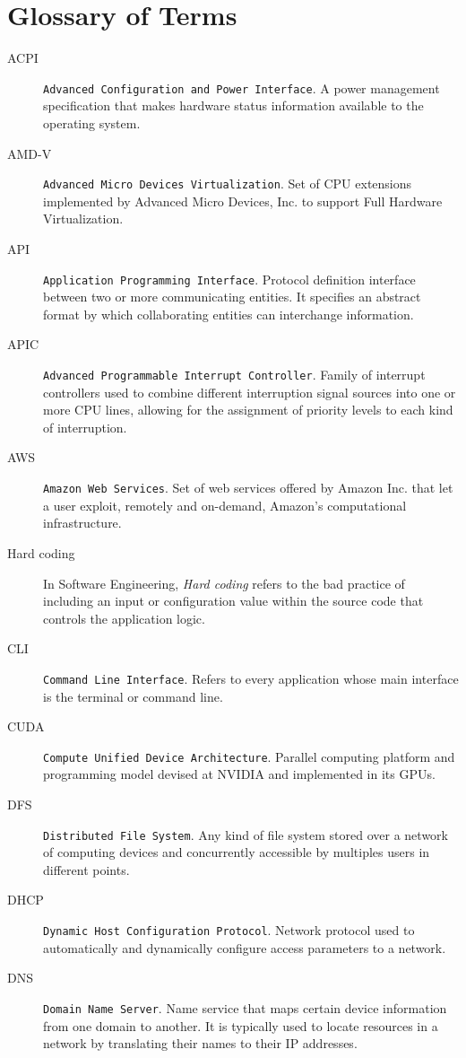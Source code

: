 \chapter{Glossary of Terms}\label{cap:glosario}
\begin{description}
\item[ACPI] \texttt{Advanced Configuration and Power Interface}. A power management specification that makes hardware status information available to the operating system.
\item[AMD-V] \texttt{Advanced Micro Devices Virtualization}. Set of CPU extensions implemented by Advanced Micro Devices, Inc. to support Full Hardware Virtualization.
\item[API] \texttt{Application Programming Interface}. Protocol definition interface between two or more communicating entities. It specifies an abstract format by which collaborating entities can interchange information.
\item[APIC] \texttt{Advanced Programmable Interrupt Controller}. Family of interrupt controllers used to combine different interruption signal sources into one or more CPU lines, allowing for the assignment of priority levels to each kind of interruption.
\item[AWS] \texttt{Amazon Web Services}. Set of web services offered by Amazon Inc. that let a user exploit, remotely and on-demand, Amazon's computational infrastructure.
\item[Hard coding] In Software Engineering, \emph{Hard coding} refers to the bad practice of including an input or configuration value within the source code that controls the application logic.
\item[CLI] \texttt{Command Line Interface}. Refers to every application whose main interface is the terminal or command line.
\item[CUDA] \texttt{Compute Unified Device Architecture}. Parallel computing platform and programming model devised at NVIDIA and implemented in its GPUs.
\item[DFS] \texttt{Distributed File System}. Any kind of file system stored over a network of computing devices and concurrently accessible by multiples users in different points.
\item[DHCP] \texttt{Dynamic Host Configuration Protocol}. Network protocol used to automatically and dynamically configure access parameters to a network.
\item[DNS] \texttt{Domain Name Server}. Name service that maps certain device information from one domain to another. It is typically used to locate resources in a network by translating their names to their IP addresses.

\end{description}
